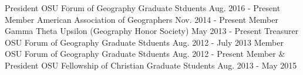 \begin{cvmemberships}
  \cvmembership
    {\hspace{-3 em} President}
    {OSU Forum of Geography Graduate Stduents}
    {\hspace{-2 em} Aug. 2016 - Present}
    {} %
  \cvmembership
    {\hspace{-3 em} Member}
    {American Association of Geographers}
    {Nov. 2014 - Present}
    {} %
  \cvmembership
    {\hspace{-3 em} Member}
    {Gamma Theta Upsilon (Geography Honor Society)}
    {May 2013 - Present}
    {} %
  \cvmembership
    {\hspace{-3 em} Treasurer}
    {OSU Forum of Geography Graduate Stduents}
    {\hspace{-2 em} Aug. 2012 - July 2013}
    {} %
  \cvmembership
    {\hspace{-3 em} Member}
    {OSU Forum of Geography Graduate Stduents}
    {Aug. 2012 - Present}
    {} %
  \cvmembership
    {\hspace{-3 em} Member \& President}
    {OSU Fellowship of Christian Graduate Students}
    {\hspace{-2 em} Aug. 2013 - May 2015}
    {} %
\end{cvmemberships}
